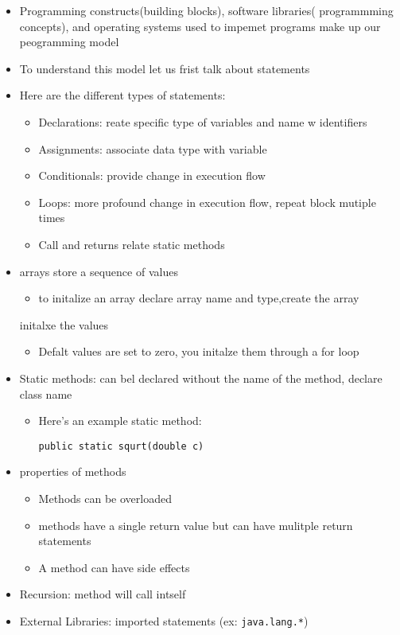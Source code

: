 \documentclass[11pt]{report}
\begin{document}
\begin{itemize}
\item Programming constructs(building blocks), software libraries( programmming concepts),
and operating systems used to impemet programs make up our
peogramming model
\item To understand this model let us frist talk about statements
\item Here are the different types of statements:
\begin{itemize}
\item Declarations: reate specific type of variables and name w
identifiers
\item Assignments: associate data type with variable
\item Conditionals: provide change in execution flow
\item Loops: more profound change in execution flow, repeat block mutiple times
\item Call and returns relate static methods
\end{itemize}
\item arrays store a sequence of values
\begin{itemize}
\item to initalize an array declare array name and type,create the array
\end{itemize}
initalxe the values
\begin{itemize}
\item Defalt values are set to zero, you initalze them through a for loop
\end{itemize}
\item Static methods: can bel declared without the name of the method, declare class
name
\begin{itemize}
\item Here's an example static method:
\begin{verbatim}
public static squrt(double c)
\end{verbatim}
\end{itemize}
\item properties of methods
\begin{itemize}
\item Methods can be overloaded
\item methods have a single return value but can have mulitple return statements
\item A method can have side effects
\end{itemize}
\item Recursion: method will call intself
\item External Libraries: imported statements (ex: \texttt{java.lang.*})
\end{itemize}
\end{document}
